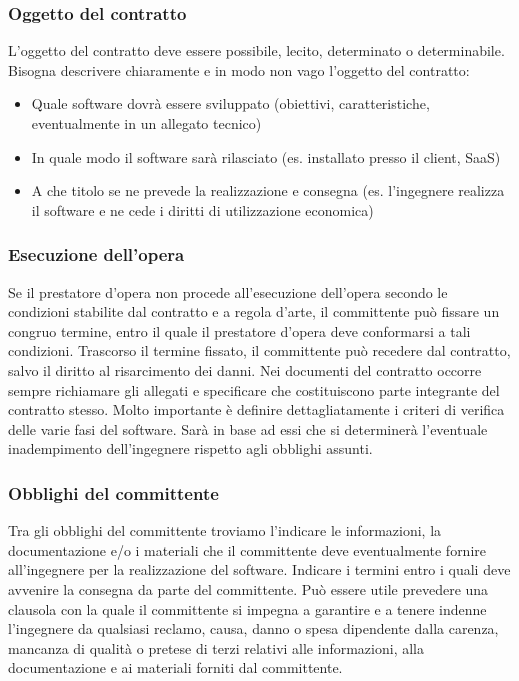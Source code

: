\subsubsection{Oggetto del contratto}
L'oggetto del contratto deve essere possibile, lecito, determinato o determinabile.\newline
Bisogna descrivere chiaramente e in modo non vago l'oggetto del contratto:
\begin{itemize}
    \item Quale software dovrà essere sviluppato (obiettivi, caratteristiche, eventualmente in un allegato tecnico)
    \item In quale modo il software sarà rilasciato (es. installato presso il client, SaaS)
    \item A che titolo se ne prevede la realizzazione e consegna (es. l'ingegnere realizza il software e ne cede i diritti di
    utilizzazione economica)
\end{itemize}
\subsubsection{Esecuzione dell'opera}
Se il prestatore d'opera non procede all'esecuzione dell'opera secondo le condizioni stabilite dal contratto e a regola d'arte,
il committente può fissare un congruo termine, entro il quale il prestatore d'opera deve conformarsi a tali condizioni. Trascorso il termine fissato, il
committente può recedere dal contratto, salvo il diritto al risarcimento dei danni.\newline
Nei documenti del contratto occorre sempre richiamare gli allegati e specificare che costituiscono parte integrante del contratto
stesso.\newline
Molto importante è definire dettagliatamente i criteri di verifica delle varie fasi del software. Sarà in base ad essi
che si determinerà l'eventuale inadempimento dell'ingegnere rispetto agli obblighi assunti.

\subsubsection{Obblighi del committente}
Tra gli obblighi del committente troviamo l'indicare le informazioni, la documentazione e/o i materiali che il committente deve
eventualmente fornire all'ingegnere per la realizzazione del software.\newline
Indicare i termini entro i quali deve avvenire la consegna da parte del committente.\newline
Può essere utile prevedere una clausola con la quale il committente si impegna a garantire e a tenere indenne l'ingegnere da qualsiasi reclamo,
causa, danno o spesa dipendente dalla carenza, mancanza di qualità o pretese di terzi relativi alle informazioni,
alla documentazione e ai materiali forniti dal committente.

